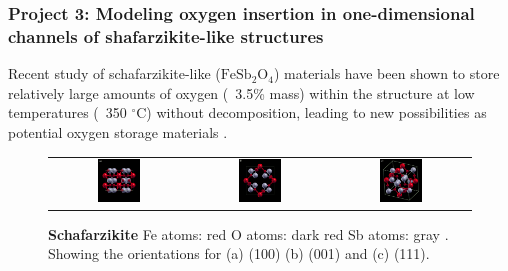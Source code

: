 \subsubsection*{Project 3: Modeling oxygen insertion in one-dimensional channels of shafarzikite-like structures}\label{deLaune}
 Recent study of schafarzikite-like ($\textrm{FeSb}_2\textrm{O}_4$) materials have been shown to store relatively large amounts of oxygen (~3.5\% mass)
within the structure at low temperatures (~350 $^{\circ}$C) without decomposition, leading to new possibilities as potential oxygen storage materials \cite{Laune2017}.


\begin{figure}[h]
  \label{fesb2o4}
  \begin{tabular}{ccc}
    \includegraphics[width=0.33\textwidth]{graphics/fesb2o4_xaxis.png} &
    \includegraphics[width=0.33\textwidth]{graphics/fesb2o4_zaxis.png} &
    \includegraphics[width=0.33\textwidth]{graphics/fesb2o4_tilted.png} \\
  \end{tabular}
  \caption{\textbf{Schafarzikite} Fe atoms: \color{red} red \color{black} O atoms: \color{BrickRed} dark red \color{black} Sb atoms: \color{Gray} gray \color{black}. Showing the orientations for (a) (100) (b) (001) and (c) (111).  }

 
\end{figure}


